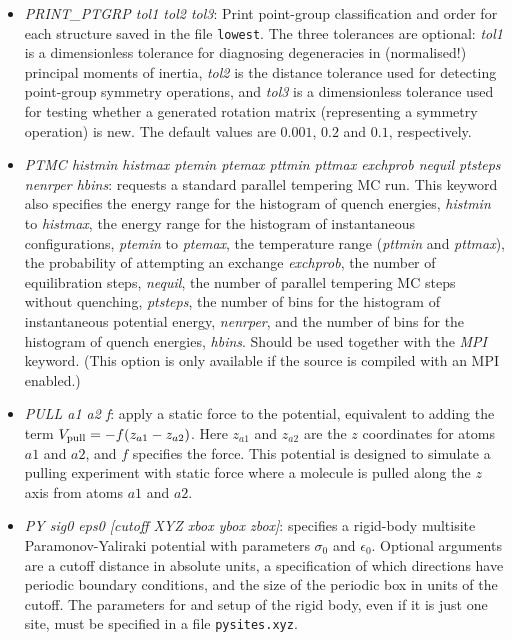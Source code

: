 \documentclass[12pt,a4paper,dvips]{article}
\begin{document}
\begin{itemize}
\item {\it PRINT\_PTGRP tol1 tol2 tol3\/}: Print point-group classification and order for each structure saved in the file {\tt lowest\/}. The three tolerances are optional: {\it tol1\/} is a dimensionless tolerance for diagnosing degeneracies in (normalised!) principal moments of inertia, {\it tol2\/} is the distance tolerance used for detecting point-group symmetry operations, and {\it tol3\/} is a dimensionless tolerance used for testing whether a generated rotation matrix (representing a symmetry operation) is new. The default values are $0.001$, $0.2$ and $0.1$, respectively.

\item {\it PTMC histmin histmax ptemin ptemax pttmin pttmax exchprob nequil ptsteps nenrper hbins\/}: 
requests a standard parallel tempering MC run.
This keyword also specifies the energy range for the histogram of quench energies,
{\it histmin\/} to {\it histmax\/},
the energy range for the histogram of instantaneous configurations, {\it ptemin} to {\it ptemax}, 
the temperature range ({\it pttmin} and {\it pttmax}), 
the probability of attempting an exchange {\it exchprob}, the 
number of equilibration steps, {\it nequil},
the number of parallel tempering MC steps without quenching,  {\it ptsteps},
the number of bins for the histogram of instantaneous potential energy, {\it nenrper}, and
the number of bins for the histogram of quench energies, {\it hbins}.
Should be used together with the {\it MPI\/} keyword. %
(This option is only available if the source is compiled with an MPI enabled.)  

\item {\it PULL a1 a2 f\/}: apply a static force to the potential, equivalent to adding
the term $V_{\rm pull}=-f(z_{a1}-z_{a2})$. Here $z_{a1}$ and $z_{a2}$ are the $z$
coordinates for atoms $a1$ and $a2$, and $f$ specifies the force.
This potential is designed to simulate a pulling experiment with static force where
a molecule is pulled along the $z$ axis from atoms $a1$ and $a2$.

\item {\it PY sig0 eps0 [cutoff XYZ xbox ybox zbox]\/}: specifies a rigid-body multisite Paramonov-Yaliraki\cite{ParamonovY05} potential with parameters $\sigma_0$ and $\epsilon_0$. Optional arguments are
a cutoff distance in absolute units, a specification of which directions have periodic boundary
conditions, and the size of the periodic box in units of the cutoff. The parameters for and setup
of the rigid body, even if it is just one site, must be specified in a file {\tt pysites.xyz}.


\end{itemize}
\end{document}
